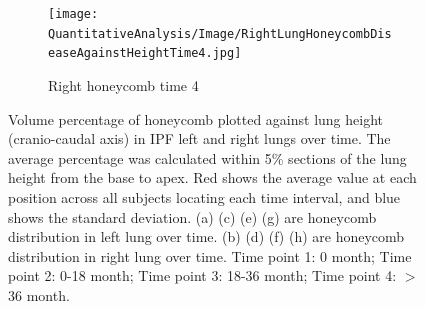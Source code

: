 \begin{figure}[H]
\begin{subfigure}{.41\linewidth}
  \label{fig:DiseaseAgainstHeightOverTime3-g} 
\end{subfigure} 
\begin{subfigure}{.41\linewidth}%
  \texttt{[image: QuantitativeAnalysis/Image/RightLungHoneycombDiseaseAgainstHeightTime4.jpg]}
  \caption{Right honeycomb time 4}
  \label{fig:DiseaseAgainstHeightOverTime3-h}
\end{subfigure}
\caption{Volume percentage of honeycomb plotted against lung height (cranio-caudal axis) in IPF left and right lungs over time. The average percentage was calculated within 5\% sections of the lung height from the base to apex. Red shows the average value at each position across all subjects locating each time interval, and blue shows the standard deviation. (a) (c) (e) (g) are honeycomb distribution in left lung over time. (b) (d) (f) (h) are honeycomb distribution in right lung over time. Time point 1: 0 month; Time point 2: 0-18 month; Time point 3: 18-36 month; Time point 4: $>$ 36 month.}
\label{fig:DiseaseAgainstHeightOverTime3}
\end{figure}

